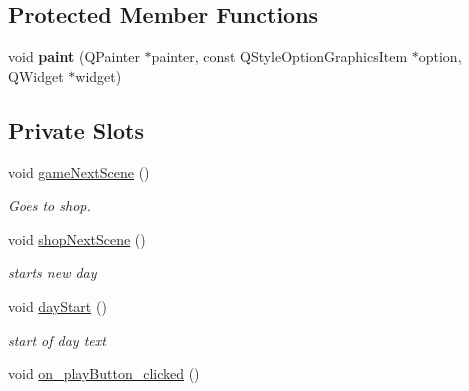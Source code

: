 \subsection*{Protected Member Functions}
\begin{DoxyCompactItemize}
\item 
\hypertarget{class_dialog_a57bbf55fbef632d7f36c30be1dbb0967}{void {\bfseries paint} (Q\-Painter $\ast$painter, const Q\-Style\-Option\-Graphics\-Item $\ast$option, Q\-Widget $\ast$widget)}\label{class_dialog_a57bbf55fbef632d7f36c30be1dbb0967}

\end{DoxyCompactItemize}
\subsection*{Private Slots}
\begin{DoxyCompactItemize}
\item 
\hypertarget{class_dialog_a98d5e2a625602be0bb710b8ac2ff19a3}{void \hyperlink{class_dialog_a98d5e2a625602be0bb710b8ac2ff19a3}{game\-Next\-Scene} ()}\label{class_dialog_a98d5e2a625602be0bb710b8ac2ff19a3}

\begin{DoxyCompactList}\small\item\em Goes to shop. \end{DoxyCompactList}\item 
\hypertarget{class_dialog_a5db671e5182ffdcc2459489068b09e35}{void \hyperlink{class_dialog_a5db671e5182ffdcc2459489068b09e35}{shop\-Next\-Scene} ()}\label{class_dialog_a5db671e5182ffdcc2459489068b09e35}

\begin{DoxyCompactList}\small\item\em starts new day \end{DoxyCompactList}\item 
\hypertarget{class_dialog_a90f373cdb54057625ae6d84dc44ee03e}{void \hyperlink{class_dialog_a90f373cdb54057625ae6d84dc44ee03e}{day\-Start} ()}\label{class_dialog_a90f373cdb54057625ae6d84dc44ee03e}

\begin{DoxyCompactList}\small\item\em start of day text \end{DoxyCompactList}\item 
\hypertarget{class_dialog_a1e35ca10fa299339816ff36590526496}{void \hyperlink{class_dialog_a1e35ca10fa299339816ff36590526496}{on\-\_\-play\-Button\-\_\-clicked} ()}\label{class_dialog_a1e35ca10fa299339816ff36590526496}


\end{DoxyCompactItemize}
